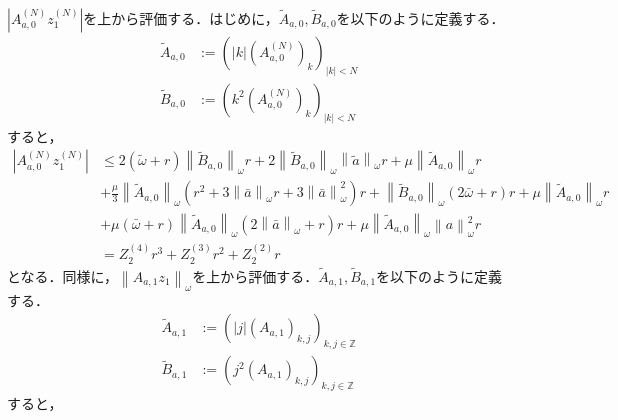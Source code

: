 \documentclass[11pt,a4paper,titlepage]{jsreport}
\theoremstyle{definition}
\begin{document}
$\left| A_{a,0}^{(N)} z_1^{(N)} \right|$を上から評価する．はじめに，$\tilde{A}_{a,0}, \tilde{B}_{a,0}$を以下のように定義する．
\begin{align*}
  \tilde{A}_{a,0} & := \left( \left| k \right| \left( A_{a,0}^{(N)} \right)_k \right)_{|k|<N} \\
  \tilde{B}_{a,0} & := \left( k^2 \left( A_{a,0}^{(N)} \right)_k \right)_{|k|<N}
\end{align*}
すると，
\begin{equation*}
  \begin{split}
    \left| A_{a,0}^{(N)} z_1^{(N)} \right| &\leq 2\left(\tilde{\omega} + r\right) \left\| \tilde{B}_{a,0} \right\|_\omega r + 2 \left\| \tilde{B}_{a,0} \right\|_\omega \left\| \tilde{a} \right\|_\omega r + \mu \left\| \tilde{A}_{a,0} \right\|_\omega r \\
    &+ \frac{\mu}{3} \left\| \tilde{A}_{a,0} \right\|_\omega \left( r^2 + 3 \left\| \bar{a} \right\|_\omega r + 3 \left\| \bar{a} \right\|^2_\omega \right) r + \left\| \tilde{B}_{a,0} \right\|_\omega \left( 2\bar{\omega} + r\right)r + \mu \left\| \tilde{A}_{a,0} \right\|_\omega r \\
    &+ \mu\left(\bar{\omega}+r\right)\left\| \tilde{A}_{a,0} \right\|_\omega \left( 2 \left\| \bar{a} \right\|_{\omega} + r\right)r + \mu \left\| \tilde{A}_{a,0} \right\|_\omega \left\| a \right\|_\omega^2 r\\
    &= Z_2^{(4)} r^3 + Z_2^{(3)} r^2 + Z_2^{(2)} r
  \end{split}
\end{equation*}
となる．同様に，$\left\| A_{a,1} z_1 \right\|_\omega$を上から評価する．$\tilde{A}_{a,1}, \tilde{B}_{a,1}$を以下のように定義する．
\begin{align*}
  \tilde{A}_{a,1} & := \left( \left| j \right| \left( A_{a,1} \right)_{k,j} \right)_{k,j\in\mathbb{Z}} \\
  \tilde{B}_{a,1} & := \left( j^2 \left( A_{a,1} \right)_{k,j} \right)_{k,j\in\mathbb{Z}}
\end{align*}
すると，
\end{document}
